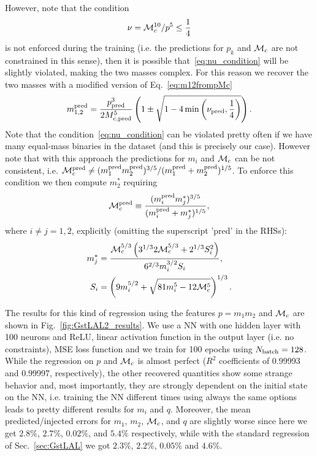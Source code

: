 \documentclass[prd,aps,twocolumn,a4paper,showkeys,nofootinbib]{revtex4-1}
\def\Mc{{\cal M}_c}
\begin{document}
However, note that the condition
\begin{equation}
\label{eq:nu_condition}
\nu=\Mc^{10}/p^5\leq \frac{1}{4}
\end{equation} 
is not enforced during the training (i.e. the predictions for 
$p_k$ and $\Mc$ are not constrained in this sense), 
then it is possible that~\eqref{eq:nu_condition} will be slightly violated, making
the two masses complex. For this reason we recover the two masses with a modified version
of Eq.~\eqref{eq:m12frompMc}
\begin{equation}
\label{eq:m12frompMc_mod}
m_{1,2}^{\rm pred} = \frac{p_{\rm pred}^3}{2 M_{c, \rm pred}^5}\left( 1 \pm \sqrt{1-4 \min\left(\nu_{\rm pred}, \frac{1}{4}\right)} \right).
\end{equation}
Note that the condition~\eqref{eq:nu_condition} can be violated pretty often 
if we have many equal-mass binaries in the dataset (and this is precisely our case).
However note that with this approach the predictions for $m_i$ and $\Mc$ can be not
consistent, i.e. 
$\Mc^{\rm pred} \neq (m_1^{\rm pred} m_2^{\rm pred})^{3/5}/(m_1^{\rm pred} + m_2^{\rm pred})^{1/5}$.
To enforce this condition we then compute $m_2^*$ requiring 
\begin{equation}
\Mc^{\rm pred} \equiv \frac{(m_i^{\rm pred} m_j^*)^{3/5}}{(m_i^{\rm pred} + m_j^{*})^{1/5}},
\end{equation}
where $i\neq j=1,2$, explicitly (omitting the superscript 'pred' in the RHSs):
\begin{align}
m_j^* &= \frac{\Mc^{5/3}\left(3^{1/3} 2 \Mc^{5/3}+2^{1/3} S_i^2 \right) }{ 6^{2/3} m_i^{3/2} S_i },  \\
S_i   &= \left(9 m_i^{5/2} + \sqrt{81 m_i^5 -12 \Mc^5}\right)^{1/3}.
\end{align}

The results for this kind of regression using the features $p=m_1 m_2$ and $\Mc$
are shown in Fig.~\ref{fig:GstLAL2_results}. We use a NN with one hidden layer with 
100 neurons and ReLU, linear activation function in the output layer (i.e. no constraints),
MSE loss function and we train for 100 epochs using $N_{\rm batch}=128$. 
While the regression on $p$ and $\Mc$ is almost perfect ($R^2$ coefficients of 0.99993 and 
0.99997, respectively), the other recovered quantities show some strange behavior and, most
importantly, they are strongly dependent on the initial state on the NN, i.e. training the NN
different times using always the same options leads to pretty different results for $m_i$ and $q$.
Moreover, the mean predicted/injected errors for $m_1$, $m_2$, $\Mc$, and $q$ are slightly worse 
since here we get $2.8\%$, $2.7\%$, $0.02\%$, and $5.4\%$ respectively, while with the standard 
regression of Sec.~\ref{sec:GstLAL} we got $2.3\%$, $2.2\%$, $0.05\%$ and $4.6\%$.
\end{document}
